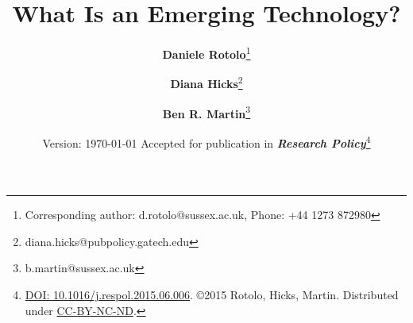\documentclass[11pt]{article}
\begin{document}
\title{\textbf{What Is an Emerging Technology?}}
\author[1,2]{\textbf{Daniele Rotolo}\thanks{Corresponding author: d.rotolo@sussex.ac.uk, Phone: +44 1273 872980}}
\author[2]{\textbf{Diana Hicks}\thanks{diana.hicks@pubpolicy.gatech.edu}}
\author[1,3]{\textbf{Ben R. Martin}\thanks{b.martin@sussex.ac.uk}}


\date{Version: \today \linebreak 
Accepted for publication in \textit{\textbf{Research Policy}}\thanks{\href{http://dx.doi.org/10.1016/j.respol.2015.06.006}{{\color{blue}DOI: 10.1016/j.respol.2015.06.006}}. \copyright 2015 Rotolo, Hicks, Martin.  Distributed under \href{http://creativecommons.org/licenses/by/4.0/}{{\color{blue}CC-BY-NC-ND}}.}}
\end{document}
